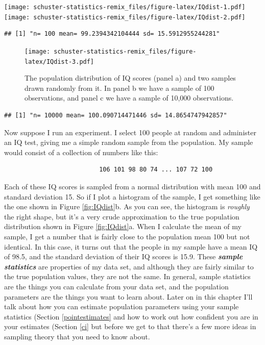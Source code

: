 \documentclass[
]{book}
\begin{document}
\texttt{[image: schuster-statistics-remix\_files/figure-latex/IQdist-1.pdf]} \texttt{[image: schuster-statistics-remix\_files/figure-latex/IQdist-2.pdf]}

\begin{verbatim}
## [1] "n= 100 mean= 99.2394342104444 sd= 15.5912955244281"
\end{verbatim}

\begin{figure}
\centering
\texttt{[image: schuster-statistics-remix\_files/figure-latex/IQdist-3.pdf]}
\caption{\label{fig:IQdist-3}The population distribution of IQ scores (panel a) and two samples drawn randomly from it. In panel b we have a sample of 100 observations, and panel c we have a sample of 10,000 observations.}
\end{figure}

\begin{verbatim}
## [1] "n= 10000 mean= 100.090714471446 sd= 14.8654747942857"
\end{verbatim}

Now suppose I run an experiment. I select 100 people at random and administer an IQ test, giving me a simple random sample from the population. My sample would consist of a collection of numbers like this:

\begin{verbatim}
                          106 101 98 80 74 ... 107 72 100
\end{verbatim}

Each of these IQ scores is sampled from a normal distribution with mean 100 and standard deviation 15. So if I plot a histogram of the sample, I get something like the one shown in Figure \ref{fig:IQdist}b. As you can see, the histogram is \emph{roughly} the right shape, but it's a very crude approximation to the true population distribution shown in Figure \ref{fig:IQdist}a. When I calculate the mean of my sample, I get a number that is fairly close to the population mean 100 but not identical. In this case, it turns out that the people in my sample have a mean IQ of 98.5, and the standard deviation of their IQ scores is 15.9. These \textbf{\emph{sample statistics}} are properties of my data set, and although they are fairly similar to the true population values, they are not the same. In general, sample statistics are the things you can calculate from your data set, and the population parameters are the things you want to learn about. Later on in this chapter I'll talk about how you can estimate population parameters using your sample statistics (Section \ref{pointestimates} and how to work out how confident you are in your estimates (Section \ref{ci} but before we get to that there's a few more ideas in sampling theory that you need to know about.
\end{document}
